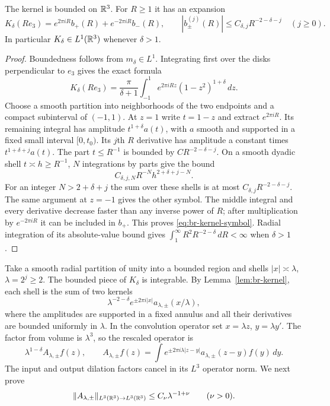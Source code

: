 \begin{lemma}\label{lem:br-kernel}
The kernel is bounded on $\mathbb R^3$.  For $R\ge1$ it has an expansion
\begin{equation}\label{eq:br-kernel-symbol}
 K_\delta(Re_3)=e^{2\pi iR}b_+(R)+e^{-2\pi iR}b_-(R),
 \qquad
 |b_\pm^{(j)}(R)|\le C_{\delta,j}R^{-2-\delta-j}
 \quad(j\ge0).
\end{equation}
In particular $K_\delta\in L^1(\mathbb R^3)$ whenever $\delta>1$.
\end{lemma}

\begin{proof}
Boundedness follows from $m_\delta\in L^1$.  Integrating first over
the disks perpendicular to $e_3$ gives the exact formula
\[
 K_\delta(Re_3)=\frac{\pi}{\delta+1}
 \int_{-1}^1e^{2\pi iRz}(1-z^2)^{1+\delta}\,dz.
\]
Choose a smooth partition into neighborhoods of the two endpoints and
a compact subinterval of $(-1,1)$.  At $z=1$ write $t=1-z$ and
extract $e^{2\pi iR}$.  Its remaining integral has amplitude
$t^{1+\delta}a(t)$, with $a$ smooth and supported in a fixed small
interval $[0,t_0)$.  Its $j$th $R$ derivative has amplitude a constant
times $t^{1+\delta+j}a(t)$.  The part $t\le R^{-1}$ is bounded by
$CR^{-2-\delta-j}$.  On a smooth dyadic shell $t\asymp h\ge R^{-1}$,
$N$ integrations by parts give the bound
\[
 C_{\delta,j,N}R^{-N}h^{2+\delta+j-N}.
\]
For an integer $N>2+\delta+j$ the sum over these shells is at most
$C_{\delta,j}R^{-2-\delta-j}$.  The same argument at $z=-1$ gives
the other symbol.  The middle integral and every derivative decrease
faster than any inverse power of $R$; after multiplication by
$e^{-2\pi iR}$ it can be included in $b_+$.  This proves
\eqref{eq:br-kernel-symbol}.  Radial integration of its absolute-value
bound gives $\int_1^\infty R^2R^{-2-\delta}\,dR<\infty$ when
$\delta>1$.
\end{proof}

Take a smooth radial partition of unity into a bounded region and
shells $|x|\asymp\lambda$, $\lambda=2^j\ge2$.  The bounded piece
of $K_\delta$ is integrable.  By Lemma~\ref{lem:br-kernel}, each shell
is the sum of two kernels
\[
 \lambda^{-2-\delta}e^{\pm2\pi i|x|}
 a_{\lambda,\pm}(x/\lambda),
\]
where the amplitudes are supported in a fixed annulus and all their
derivatives are bounded uniformly in $\lambda$.  In the convolution
operator set $x=\lambda z$, $y=\lambda y'$.  The factor from volume
is $\lambda^3$, so the rescaled operator is
\begin{equation}\label{eq:br-rescaled-shell}
 \lambda^{1-\delta}A_{\lambda,\pm}f(z),\qquad
 A_{\lambda,\pm}f(z)=
 \int e^{\pm2\pi i\lambda|z-y|}a_{\lambda,\pm}(z-y)f(y)\,dy.
\end{equation}
The input and output dilation factors cancel in its $L^3$ operator
norm.  We next prove
\begin{equation}\label{eq:br-unit-shell}
 \|A_{\lambda,\pm}\|_{L^3(\mathbb R^3)\to L^3(\mathbb R^3)}
 \le C_\nu\lambda^{-1+\nu} \qquad(\nu>0).
\end{equation}

